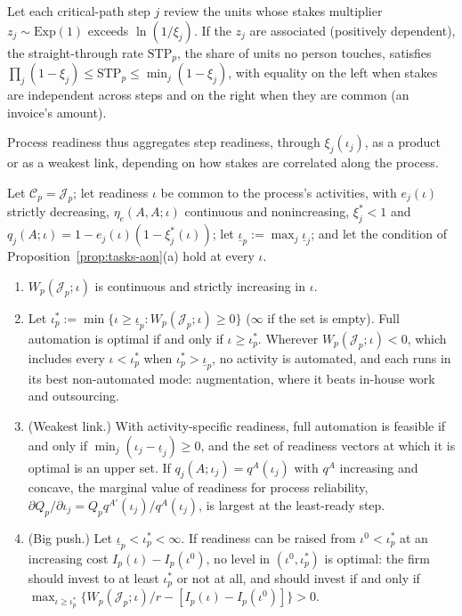 \begin{lemma}\label{lem:tasks-stp}
Let each critical-path step $j$ review the units whose stakes multiplier $z_j\sim\mathrm{Exp}(1)$ exceeds $\ln(1/\xi_j)$. If the $z_j$ are associated (positively dependent), the straight-through rate $\mathrm{STP}_p$, the share of units no person touches, satisfies $\prod_j(1-\xi_j)\le\mathrm{STP}_p\le\min_j(1-\xi_j)$, with equality on the left when stakes are independent across steps and on the right when they are common (an invoice's amount).
\end{lemma}

\noindent Process readiness thus aggregates step readiness, through $\xi_j(\iota_j)$, as a product or as a weakest link, depending on how stakes are correlated along the process.

\begin{proposition}\label{prop:tasks-readiness}
Let $\mathcal C_p=\mathcal J_p$; let readiness $\iota$ be common to the process's activities, with $e_j(\iota)$ strictly decreasing, $\eta_e(A,A;\iota)$ continuous and nonincreasing, $\xi^*_j<1$ and $q_j(A;\iota)=1-e_j(\iota)(1-\xi^*_j(\iota))$; let $\underline\iota_p:=\max_j\underline\iota_j$; and let the condition of Proposition~\ref{prop:tasks-aon}(a) hold at every $\iota$.
\begin{enumerate}
\item[(a)] $W_p(\mathcal J_p;\iota)$ is continuous and strictly increasing in $\iota$.
\item[(b)] Let $\iota^*_p:=\min\{\iota\ge\underline\iota_p:W_p(\mathcal J_p;\iota)\ge 0\}$ ($\infty$ if the set is empty). Full automation is optimal if and only if $\iota\ge\iota^*_p$. Wherever $W_p(\mathcal J_p;\iota)<0$, which includes every $\iota<\iota^*_p$ when $\iota^*_p>\underline\iota_p$, no activity is automated, and each runs in its best non-automated mode: augmentation, where it beats in-house work and outsourcing.
\item[(c)] (Weakest link.) With activity-specific readiness, full automation is feasible if and only if $\min_j(\iota_j-\underline\iota_j)\ge 0$, and the set of readiness vectors at which it is optimal is an upper set. If $q_j(A;\iota_j)=q^A(\iota_j)$ with $q^A$ increasing and concave, the marginal value of readiness for process reliability, $\partial Q_p/\partial\iota_j=Q_pq^{A\prime}(\iota_j)/q^A(\iota_j)$, is largest at the least-ready step.
\item[(d)] (Big push.) Let $\underline\iota_p<\iota^*_p<\infty$. If readiness can be raised from $\iota^0<\iota^*_p$ at an increasing cost $I_p(\iota)-I_p(\iota^0)$, no level in $(\iota^0,\iota^*_p)$ is optimal: the firm should invest to at least $\iota^*_p$ or not at all, and should invest if and only if $\max_{\iota\ge\iota^*_p}\{W_p(\mathcal J_p;\iota)/r-[I_p(\iota)-I_p(\iota^0)]\}>0$.
\end{enumerate}
\end{proposition}

